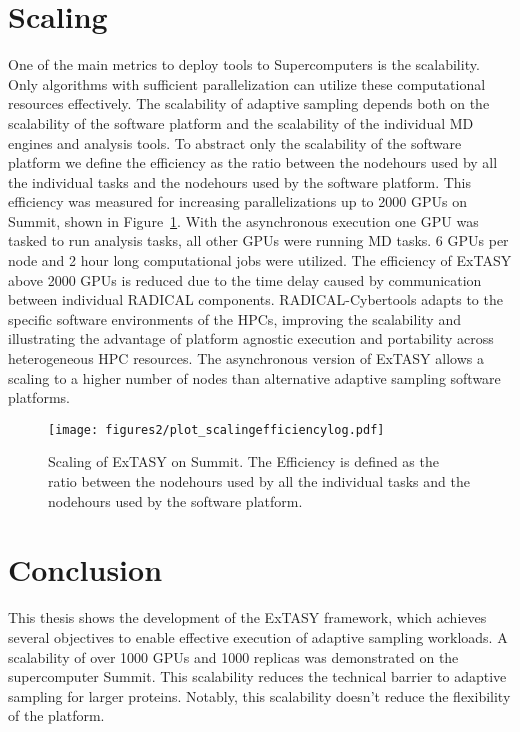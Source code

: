 {\section{\label{sec:scaling}Scaling}


One of the main metrics to deploy tools to Supercomputers is the scalability. Only algorithms with sufficient parallelization can utilize these computational resources effectively. The scalability of adaptive sampling depends both on the scalability of the software platform and the scalability of the individual MD engines and analysis tools. To abstract only the scalability of the software platform we define the efficiency as the ratio between the nodehours used by all the individual tasks and the nodehours used by the software platform. 
This efficiency was measured for increasing parallelizations up to 2000 GPUs on Summit, shown in Figure~\ref{fig:scaling}. With the asynchronous execution one GPU was tasked to run analysis tasks, all other GPUs were running MD tasks. 6 GPUs per node and 2 hour long computational jobs were utilized. The efficiency of ExTASY above 2000 GPUs is reduced due to the time delay caused by communication between individual RADICAL components. RADICAL-Cybertools adapts to the specific software environments of the HPCs\cite{turilli2019ac}, improving the scalability and illustrating the advantage of platform agnostic execution and portability across
heterogeneous HPC resources. The asynchronous version of ExTASY allows a scaling to a higher number of nodes than alternative adaptive sampling software platforms.

\begin{figure}[H]
  \centering
  \texttt{[image: figures2/plot\_scalingefficiencylog.pdf]}
  \caption{Scaling of ExTASY on Summit. The Efficiency is defined as the ratio between the nodehours used by all the individual tasks and the nodehours used by the software platform. }
  \label{fig:scaling}
\end{figure}



\section{\label{sec:conclusion}Conclusion}
This thesis shows the development of the ExTASY framework, which achieves several objectives to enable effective execution of adaptive sampling workloads. A scalability of over 1000 GPUs and 1000 replicas was demonstrated on the supercomputer Summit. This scalability reduces the technical barrier to adaptive sampling for larger proteins. Notably, this scalability doesn't reduce the flexibility of the platform.

}
